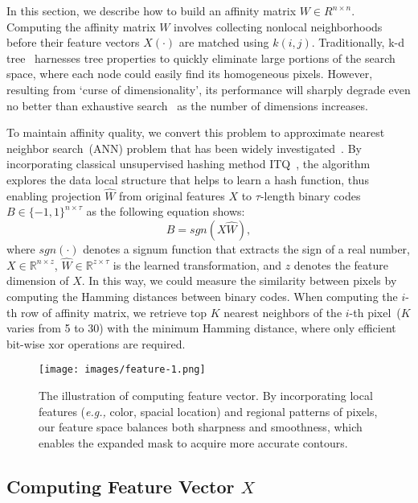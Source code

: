 \documentclass[sigconf]{acmart}
\begin{document}
In this section, we describe how to build an affinity matrix $W\in R^{n\times n}$. Computing the affinity matrix $W$ involves collecting nonlocal neighborhoods before their feature vectors $X(\cdot)$ are matched using $k(i,j)$. Traditionally, k-d tree~\cite{kdtree} harnesses tree properties to quickly eliminate large portions of the search space, where each node could easily find its homogeneous pixels. However, resulting from `curse of dimensionality', its performance will sharply degrade even no better than exhaustive search~\cite{DBLP:reference/cg/2004} as the number of dimensions increases.

To maintain affinity quality, we convert this problem to approximate nearest neighbor search~(ANN) problem that has been widely investigated~\cite{SDH,robusthash,zeroshothash,asym}. By incorporating classical unsupervised hashing method ITQ~\cite{gong2013iterative}, the algorithm explores the data local structure that helps to learn a hash function, thus enabling projection $\hat{W}$ from original features $X$ to $\tau$-length binary codes $B\in \{-1, 1\}^{n\times\tau}$ as the following equation shows:
\begin{equation}
B = sgn(X\hat{W}),
\end{equation}
where $sgn(\cdot)$ denotes a signum function that extracts the sign of a real number, $X\in\mathbb{R}^{n\times z}$,  $\hat{W}\in\mathbb{R}^{z\times\tau}$ is the learned transformation, and $z$ denotes the feature dimension of $X$. In this way, we could measure the similarity between pixels by computing the Hamming distances between binary codes. When computing the $i$-th row of affinity matrix, we retrieve top $K$ nearest neighbors of the $i$-th pixel~($K$ varies from 5 to 30) with the minimum Hamming distance, where only efficient bit-wise xor operations are required.\\
\begin{figure}[!htb]
	\centering
	\texttt{[image: images/feature-1.png]}\\
	\caption{The illustration of computing feature vector. By incorporating local features (\textit{e.g.,} color, spacial location) and regional patterns of pixels, our feature space balances both sharpness and smoothness, which enables the expanded mask to acquire more accurate contours. }
	\label{fig:feature}
\end{figure}

\subsection{Computing Feature Vector $X$}
\end{document}
